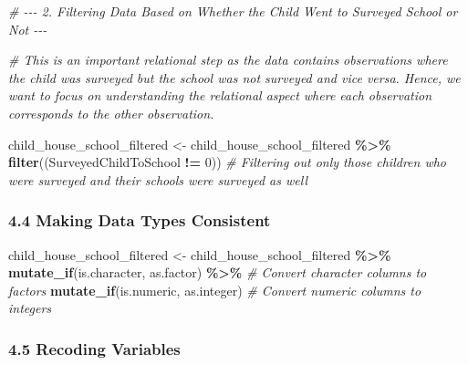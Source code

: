 \documentclass[
]{article}
\newenvironment{Shaded}{\begin{snugshade}}{\end{snugshade}}
\newcommand{\CommentTok}[1]{\textcolor[rgb]{0.56,0.35,0.01}{\textit{#1}}}
\newcommand{\DecValTok}[1]{\textcolor[rgb]{0.00,0.00,0.81}{#1}}
\newcommand{\FunctionTok}[1]{\textcolor[rgb]{0.13,0.29,0.53}{\textbf{#1}}}
\newcommand{\NormalTok}[1]{#1}
\newcommand{\OtherTok}[1]{\textcolor[rgb]{0.56,0.35,0.01}{#1}}
\newcommand{\SpecialCharTok}[1]{\textcolor[rgb]{0.81,0.36,0.00}{\textbf{#1}}}
\begin{document}
\begin{Shaded}
\begin{Highlighting}[]
\CommentTok{\# {-}{-}{-} 2. Filtering Data Based on Whether the Child Went to Surveyed School or Not  {-}{-}{-}}

\CommentTok{\# This is an important relational step as the data contains observations where the child was surveyed but the school was not surveyed and vice versa. Hence, we want to focus on understanding the relational aspect where each observation corresponds to the other observation.}

\NormalTok{child\_house\_school\_filtered }\OtherTok{\textless{}{-}}\NormalTok{ child\_house\_school\_filtered }\SpecialCharTok{\%\textgreater{}\%}
  \FunctionTok{filter}\NormalTok{((SurveyedChildToSchool }\SpecialCharTok{!=} \DecValTok{0}\NormalTok{)) }\CommentTok{\# Filtering out only those children who were surveyed and their schools were surveyed as well}
\end{Highlighting}
\end{Shaded}

\subsubsection{4.4 Making Data Types
Consistent}\label{making-data-types-consistent}

\begin{Shaded}
\begin{Highlighting}[]
\NormalTok{child\_house\_school\_filtered }\OtherTok{\textless{}{-}}\NormalTok{ child\_house\_school\_filtered }\SpecialCharTok{\%\textgreater{}\%}
  \FunctionTok{mutate\_if}\NormalTok{(is.character, as.factor) }\SpecialCharTok{\%\textgreater{}\%} \CommentTok{\# Convert character columns to factors}
  \FunctionTok{mutate\_if}\NormalTok{(is.numeric, as.integer) }\CommentTok{\# Convert numeric columns to integers}
\end{Highlighting}
\end{Shaded}

\subsubsection{4.5 Recoding Variables}\label{recoding-variables}
\end{document}
